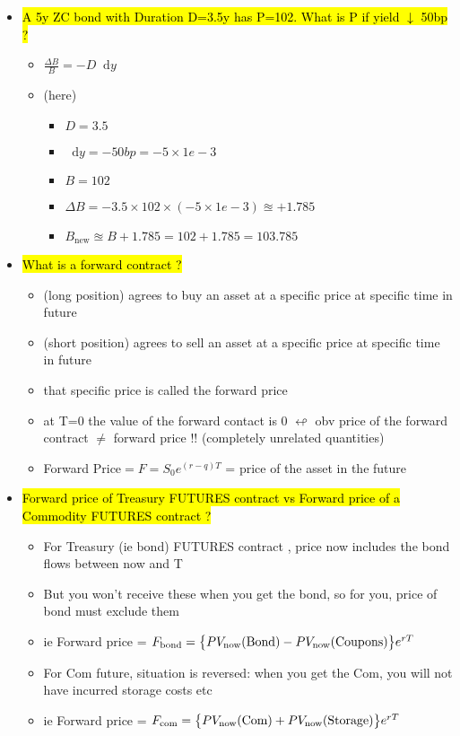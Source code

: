 \documentclass[10pt,landscape,a4paper]{article}
\newcommand{\myblp}{ \big \{ }
\newcommand{\mybrp}{ \big \} }
\newcommand*\dif{\mathop{}\!\mathrm{d}}
\begin{document}
\begin{multicols*}{4}
\begin{spacing}{0.1}
\begin{itemize}
\item \hl{A 5y ZC bond with Duration D=3.5y has P=102. What is P if yield $\downarrow$ 50bp ?}
\begin{itemize}
	\item $\frac{\Delta B}{B} = -D \dif y$
	\item (here) 
	\begin{itemize} 
		\item $D = 3.5$
		\item $\dif y = - 50 bp = - 5 \times 1e-3$
		\item $B=102$
		\item  $\Delta B = - 3.5 \times 102 \times (- 5 \times 1e-3) \approxeq + 1.785$
		\item $B_{\text{new}}\approxeq B+ 1.785 = 102 + 1.785 = 103.785$
	\end{itemize}
\end{itemize}

\item \hl{What is a forward contract ?}
\begin{itemize}
	\item (long position) agrees to buy an asset at a specific price at specific time in future
	\item (short position) agrees to sell an asset at a specific price at specific time in future
	\item that specific price is called the forward price 
	\item at T=0 the value of the forward contact is 0 $\looparrowleft$ obv price of the forward contract $\neq$ forward price !! (completely unrelated quantities)
	\item Forward Price$=F=S_0 e^{(r-q)T}$ = price of the asset in the future
	
\end{itemize}


\item \hl{Forward price of Treasury FUTURES contract vs Forward price of a Commodity FUTURES contract ?}
\begin{itemize}
	\item For Treasury (ie bond) FUTURES contract , price now includes the bond flows between now and T
	\item But you won't receive these when you get the bond, so for you, price of bond must exclude them
	\item ie Forward price = $F_{\text{bond}} \\= \myblp PV_{\text{now}}{\text{(Bond)}} -PV_{\text{now}}\text{(Coupons)} \mybrp e^{rT}$
	\item For Com future, situation is reversed: when you get the Com, you will not have incurred storage costs etc
	\item ie Forward price =  $F_{\text{com}} \\= \myblp PV_{\text{now}}{\text{(Com)}} + PV_{\text{now}}\text{(Storage)} \mybrp e^{rT}$
\end{itemize}


\end{itemize}
\end{spacing}
\end{multicols*}
\end{document}
